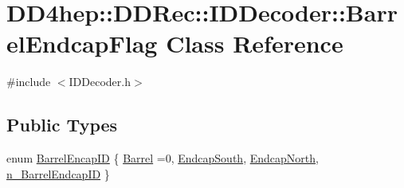 \hypertarget{class_d_d4hep_1_1_d_d_rec_1_1_i_d_decoder_1_1_barrel_endcap_flag}{}\section{D\+D4hep\+:\+:D\+D\+Rec\+:\+:I\+D\+Decoder\+:\+:Barrel\+Endcap\+Flag Class Reference}
\label{class_d_d4hep_1_1_d_d_rec_1_1_i_d_decoder_1_1_barrel_endcap_flag}


{\ttfamily \#include $<$I\+D\+Decoder.\+h$>$}

\subsection*{Public Types}
\begin{DoxyCompactItemize}
\item 
enum \hyperlink{class_d_d4hep_1_1_d_d_rec_1_1_i_d_decoder_1_1_barrel_endcap_flag_acbdae4d36c49605ada531eddce7b60d8}{Barrel\+Encap\+ID} \{ \hyperlink{class_d_d4hep_1_1_d_d_rec_1_1_i_d_decoder_1_1_barrel_endcap_flag_acbdae4d36c49605ada531eddce7b60d8aafbebf249136c9aee1824885ee80a419}{Barrel} =0, 
\hyperlink{class_d_d4hep_1_1_d_d_rec_1_1_i_d_decoder_1_1_barrel_endcap_flag_acbdae4d36c49605ada531eddce7b60d8acd4918f139ed7b752c6959441b4f435d}{Endcap\+South}, 
\hyperlink{class_d_d4hep_1_1_d_d_rec_1_1_i_d_decoder_1_1_barrel_endcap_flag_acbdae4d36c49605ada531eddce7b60d8a49d61b44da3d6085afd4fbe6e97d5131}{Endcap\+North}, 
\hyperlink{class_d_d4hep_1_1_d_d_rec_1_1_i_d_decoder_1_1_barrel_endcap_flag_acbdae4d36c49605ada531eddce7b60d8afdede631cdf7cb28f6a1bb68d9ded732}{n\+\_\+\+Barrel\+Endcap\+ID}
 \}
\end{DoxyCompactItemize}
